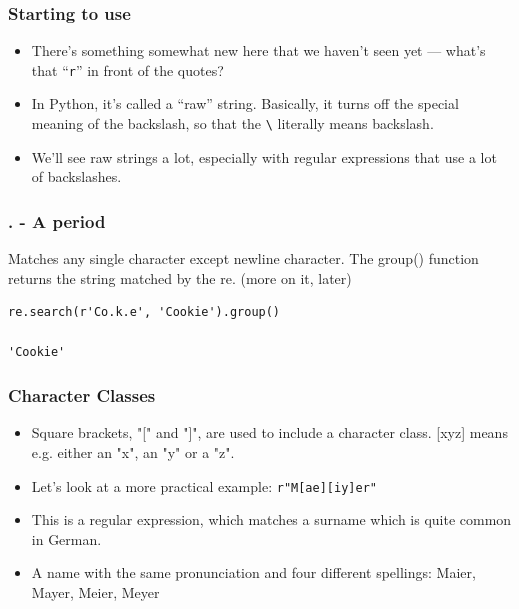  \begin{frame}[fragile]
\frametitle{Starting to use}
\begin{itemize}
\item There's something somewhat new here that we haven't seen yet ---
what's that ``\texttt{r}'' in front of the quotes?  
\item  In Python, it's
called a ``raw'' string.  Basically, it turns off the special meaning
of the backslash, so that the \lstinline+\+ literally means backslash.
\item We'll see raw strings a lot, especially with regular expressions that
use a lot of backslashes.
\end{itemize}
\end{frame}

 \begin{frame}[fragile]
\frametitle{. - A period}
Matches any single character except newline character. The group() function returns the string matched by the re. (more on it, later)

\begin{lstlisting}
re.search(r'Co.k.e', 'Cookie').group()

'Cookie'
\end{lstlisting}

\end{frame}



 \begin{frame}[fragile]
\frametitle{Character Classes}

\begin{itemize}
\item Square brackets, "[" and "]", are used to include a character class. [xyz] means e.g. either an "x", an "y" or a "z". 
\item Let's look at a more practical example: \lstinline|r"M[ae][iy]er"|
\item This is a regular expression, which matches a surname which is quite common in German. 
\item A name with the same pronunciation and four different spellings: Maier, Mayer, Meier, Meyer 
\end{itemize}
\end{frame}

